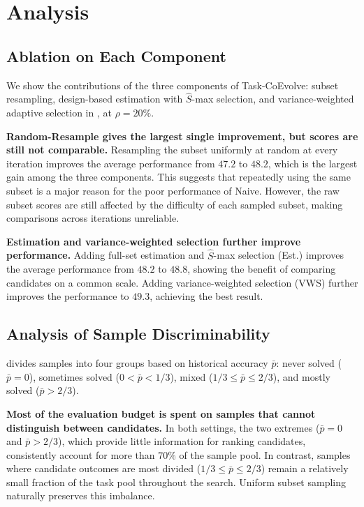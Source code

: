 \documentclass{article} %
\begin{document}
\section{Analysis}
\subsection{Ablation on Each Component}
\label{subsec:ablation}

We show the contributions of the three components of Task-CoEvolve: subset resampling, design-based estimation with $\hat{S}$-max selection, and variance-weighted adaptive selection in , at $\rho{=}20\%$.

\textbf{Random-Resample gives the largest single improvement, but scores are still not comparable.}
Resampling the subset uniformly at random at every iteration improves the average performance from $47.2$ to $48.2$, which is the largest gain among the three components. This suggests that repeatedly using the same subset is a major reason for the poor performance of Naive. However, the raw subset scores are still affected by the difficulty of each sampled subset, making comparisons across iterations unreliable.

\textbf{Estimation and variance-weighted selection further improve performance.}
Adding full-set estimation and $\hat{S}$-max selection (Est.) improves the average performance from $48.2$ to $48.8$, showing the benefit of comparing candidates on a common scale. Adding variance-weighted selection (VWS) further improves the performance to $49.3$, achieving the best result.


\subsection{Analysis of Sample Discriminability}
\label{subsec:difficulty}
 divides samples into four groups based on historical accuracy $\bar{p}$: never solved ($\bar{p}=0$), sometimes solved ($0<\bar{p}<1/3$), mixed ($1/3 \leq \bar{p} \leq 2/3$), and mostly solved ($\bar{p}>2/3$).


\textbf{Most of the evaluation budget is spent on samples that cannot distinguish between candidates.}
In both settings, the two extremes ($\bar{p}=0$ and $\bar{p}>2/3$), which provide little information for ranking candidates, consistently account for more than 70\% of the sample pool. In contrast, samples where candidate outcomes are most divided ($1/3 \leq \bar{p} \leq 2/3$) remain a relatively small fraction of the task pool throughout the search. Uniform subset sampling naturally preserves this imbalance.
\end{document}
